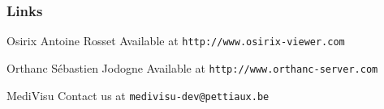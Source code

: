\documentclass[11pt]{beamer}
\begin{document}
\begin{frame}
  \frametitle{Links}
    
  \begin{thebibliography}{10}
        
  \beamertemplatearticlebibitems
 
%
 
  	Osirix
    \newblock Antoine Rosset
    \newblock Available at {\tt http://www.osirix-viewer.com}
    
    \beamertemplatearticlebibitems
 
  	Orthanc
    \newblock Sébastien Jodogne
    \newblock Available at {\tt http://www.orthanc-server.com}
    
    MediVisu
    \newblock Contact us at {\tt medivisu-dev@pettiaux.be}
 
  \end{thebibliography}
\end{frame}
\end{document}
